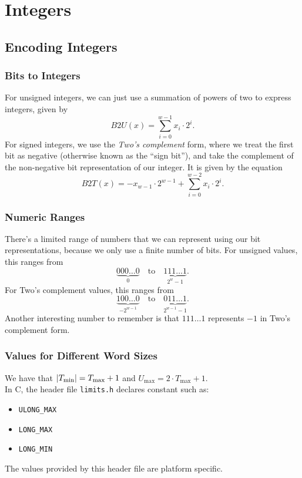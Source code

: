 \documentclass[class=article, crop=false]{standalone}
\begin{document}
  \section{Integers}
  \subsection{Encoding Integers}
  \subsubsection{Bits to Integers}
  For unsigned integers, we can just use a summation of powers of two to express integers, given by
  \[
    B2U(x) = \sum_{i=0}^{w-1}x_i\cdot 2^i.
  \]
  For signed integers, we use the \emph{Two's complement} form, where we treat the first bit as negative (otherwise known as the ``sign bit''), and take the complement of the non-negative bit representation of our integer. It is given by the equation
  \[
    B2T(x) = -x_{w-1}\cdot 2^{w-1} + \sum_{i=0}^{w-2}x_i\cdot 2^i.
  \]
  \subsubsection{Numeric Ranges}
  There's a limited range of numbers that we can represent using our bit representations, because we only use a finite number of bits. For unsigned values, this ranges from 
  \[
    \underbrace{000\ldots 0}_{0} \quad \text{to}\quad \underbrace{111\ldots 1}_{2^w - 1}.
  \]
  For Two's complement values, this ranges from
  \[
    \underbrace{100\ldots 0}_{-2^{w-1}} \quad \text{to}\quad \underbrace{011\ldots 1}_{2^{w-1}-1}.
  \]
  Another interesting number to remember is that $111\ldots 1$ represents $-1$ in Two's complement form.
  \subsubsection{Values for Different Word Sizes}
  We have that $\left\lvert T_{\text{min}} \right\rvert = T_{\text{max}}+1$ and $U_{\text{max}} = 2\cdot T_{\text{max}}+1$. \\[10pt]
  In C, the header file \texttt{limits.h} declares constant such as:
  \begin{itemize}
    \item \texttt{ULONG\_MAX}
    \item \texttt{LONG\_MAX}
    \item \texttt{LONG\_MIN}
  \end{itemize}
  \begin{note}{}
    The values provided by this header file are platform specific.
  \end{note}
\end{document}
